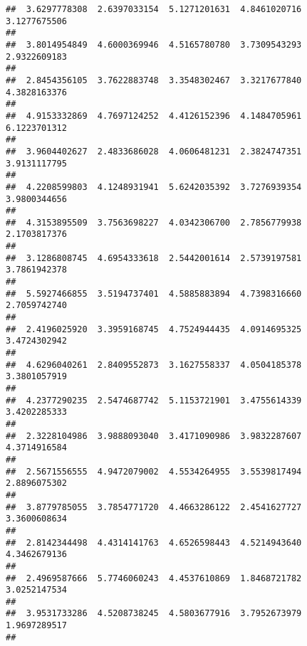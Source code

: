 \documentclass[]{article}
\begin{document}
\begin{verbatim}
##  3.6297778308  2.6397033154  5.1271201631  4.8461020716  3.1277675506 
##                                                                       
##  3.8014954849  4.6000369946  4.5165780780  3.7309543293  2.9322609183 
##                                                                       
##  2.8454356105  3.7622883748  3.3548302467  3.3217677840  4.3828163376 
##                                                                       
##  4.9153332869  4.7697124252  4.4126152396  4.1484705961  6.1223701312 
##                                                                       
##  3.9604402627  2.4833686028  4.0606481231  2.3824747351  3.9131117795 
##                                                                       
##  4.2208599803  4.1248931941  5.6242035392  3.7276939354  3.9800344656 
##                                                                       
##  4.3153895509  3.7563698227  4.0342306700  2.7856779938  2.1703817376 
##                                                                       
##  3.1286808745  4.6954333618  2.5442001614  2.5739197581  3.7861942378 
##                                                                       
##  5.5927466855  3.5194737401  4.5885883894  4.7398316660  2.7059742740 
##                                                                       
##  2.4196025920  3.3959168745  4.7524944435  4.0914695325  3.4724302942 
##                                                                       
##  4.6296040261  2.8409552873  3.1627558337  4.0504185378  3.3801057919 
##                                                                       
##  4.2377290235  2.5474687742  5.1153721901  3.4755614339  3.4202285333 
##                                                                       
##  2.3228104986  3.9888093040  3.4171090986  3.9832287607  4.3714916584 
##                                                                       
##  2.5671556555  4.9472079002  4.5534264955  3.5539817494  2.8896075302 
##                                                                       
##  3.8779785055  3.7854771720  4.4663286122  2.4541627727  3.3600608634 
##                                                                       
##  2.8142344498  4.4314141763  4.6526598443  4.5214943640  4.3462679136 
##                                                                       
##  2.4969587666  5.7746060243  4.4537610869  1.8468721782  3.0252147534 
##                                                                       
##  3.9531733286  4.5208738245  4.5803677916  3.7952673979  1.9697289517 
##                                                                       

\end{verbatim}
\end{document}
